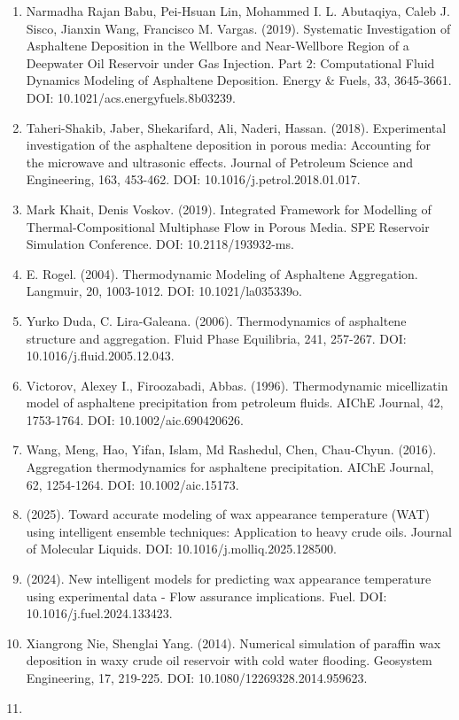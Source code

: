 \documentclass[11pt]{extarticle}
\begin{document}
\begin{enumerate}
\item
  Narmadha Rajan Babu, Pei-Hsuan Lin, Mohammed I. L. Abutaqiya, Caleb J. Sisco, Jianxin Wang, Francisco M. Vargas. (2019). Systematic Investigation of Asphaltene Deposition in the Wellbore and Near-Wellbore Region of a Deepwater Oil Reservoir under Gas Injection. Part 2: Computational Fluid Dynamics Modeling of Asphaltene Deposition. Energy \& Fuels, 33, 3645-3661. DOI: 10.1021/acs.energyfuels.8b03239.
\item
  Taheri-Shakib, Jaber, Shekarifard, Ali, Naderi, Hassan. (2018). Experimental investigation of the asphaltene deposition in porous media: Accounting for the microwave and ultrasonic effects. Journal of Petroleum Science and Engineering, 163, 453-462. DOI: 10.1016/j.petrol.2018.01.017.
\item
  Mark Khait, Denis Voskov. (2019). Integrated Framework for Modelling of Thermal-Compositional Multiphase Flow in Porous Media. SPE Reservoir Simulation Conference. DOI: 10.2118/193932-ms.
\item
  E. Rogel. (2004). Thermodynamic Modeling of Asphaltene Aggregation. Langmuir, 20, 1003-1012. DOI: 10.1021/la035339o.
\item
  Yurko Duda, C. Lira-Galeana. (2006). Thermodynamics of asphaltene structure and aggregation. Fluid Phase Equilibria, 241, 257-267. DOI: 10.1016/j.fluid.2005.12.043.
\item
  Victorov, Alexey I., Firoozabadi, Abbas. (1996). Thermodynamic micellizatin model of asphaltene precipitation from petroleum fluids. AIChE Journal, 42, 1753-1764. DOI: 10.1002/aic.690420626.
\item
  Wang, Meng, Hao, Yifan, Islam, Md Rashedul, Chen, Chau‐Chyun. (2016). Aggregation thermodynamics for asphaltene precipitation. AIChE Journal, 62, 1254-1264. DOI: 10.1002/aic.15173.
\item
  (2025). Toward accurate modeling of wax appearance temperature (WAT) using intelligent ensemble techniques: Application to heavy crude oils. Journal of Molecular Liquids. DOI: 10.1016/j.molliq.2025.128500.
\item
  (2024). New intelligent models for predicting wax appearance temperature using experimental data - Flow assurance implications. Fuel. DOI: 10.1016/j.fuel.2024.133423.
\item
  Xiangrong Nie, Shenglai Yang. (2014). Numerical simulation of paraffin wax deposition in waxy crude oil reservoir with cold water flooding. Geosystem Engineering, 17, 219-225. DOI: 10.1080/12269328.2014.959623.
\item

\end{enumerate}
\end{document}
